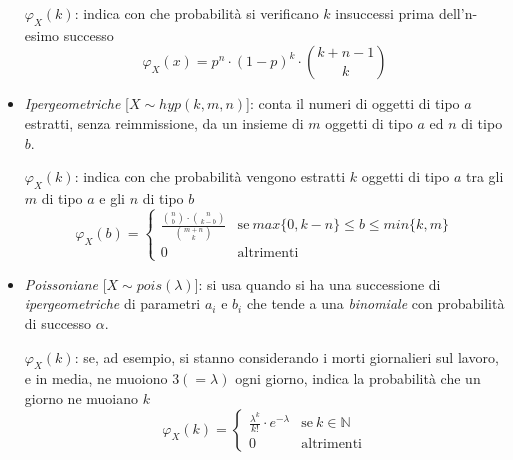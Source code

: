 \documentclass[12pt, a4paper]{report}
\theoremstyle{definition}
\newcommand{\N}{\mathbb{N}}
\begin{document}
\begin{itemize}
	\(\varphi_X(k)\): indica con che probabilità si verificano $k$ insuccessi
	prima dell'n-esimo successo
    \[\varphi_X(x)=p^n\cdot(1-p)^k\cdot\binom{k+n-1}{k}\]

	\item \emph{Ipergeometriche} [$X\sim hyp(k,m,n)$]: conta il numeri di oggetti
	di tipo $a$ estratti, senza reimmissione, da un insieme di $m$ oggetti di tipo
	$a$ ed $n$ di tipo $b$.

	\(\varphi_X(k)\): indica con che probabilità vengono estratti $k$ oggetti
	di tipo $a$ tra gli $m$ di tipo $a$ e gli $n$ di tipo $b$
    \[\varphi_X(b)=\begin{cases}
		{\frac{\binom{n}{b}\cdot\binom{n}{k-b}}{\binom{m+n}{k}}} & \text{se}\ {max\{
		0,k-n\}\leq b\leq min\{k,m\}}\\
		{0} & \text{altrimenti}
	\end{cases}\]

	\item \emph{Poissoniane} [$X\sim pois(\lambda)$]: si usa quando si ha una
	successione di \emph{ipergeometriche} di parametri $a_i$ e $b_i$ che tende a
	una \emph{binomiale} con probabilità di successo $\alpha$.

	\(\varphi_X(k)\): se, ad esempio, si stanno considerando i morti giornalieri
	sul lavoro, e in media, ne muoiono \(3(=\lambda)\) ogni giorno, indica la
	probabilità che un giorno ne muoiano $k$
    \[\varphi_X(k)=\begin{cases}
		{\frac{\lambda^k}{k!}\cdot e^{-\lambda}} & \text{se}\ {k\in\N}\\
		{0} & \text{altrimenti}
	\end{cases}\]
\end{itemize}
\end{document}
